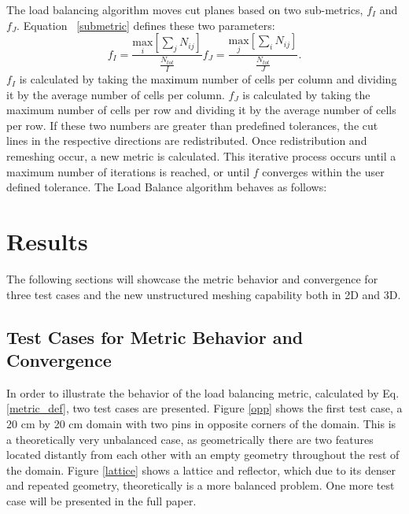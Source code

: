 \documentclass{anstrans}
\begin{document}
The load balancing algorithm moves cut planes based on two sub-metrics, $f_I$ and $f_J$. Equation ~\eqref{submetric} defines these two parameters:
\begin{subequations}
\label{submetric}
\begin{equation}
f_I = \frac{ \underset{i}{\text{max}}[\sum_{j} N_{ij}] } {\frac{N_{tot}}{I}} 
\end{equation}
\begin{equation}
f_J = \frac{\underset{j}{\text{max}}[\sum_{i} N_{ij}] } {\frac{N_{tot}}{J}}.
\end{equation}
\end{subequations}
%
$f_I$ is calculated by taking the maximum number of cells per column and dividing it by the average number of cells per column. $f_J$ is calculated by taking the maximum number of cells per row and dividing it by the average number of cells per row. If these two numbers are greater than predefined tolerances, the cut lines in the respective directions are redistributed. Once redistribution and remeshing occur, a new metric is calculated. This iterative process occurs until a maximum number of iterations is reached, or until $f$ converges within the user defined tolerance. The Load Balance algorithm behaves as follows:



\section{Results}
\label{ch:results}

The following sections will showcase the metric behavior and convergence for three test cases and the new unstructured meshing capability both in 2D and 3D.

\subsection{Test Cases for Metric Behavior and Convergence}
\label{sec:convergence}
In order to illustrate the behavior of the load balancing metric, calculated by Eq.\ref{metric_def}, two test cases are presented. Figure \ref{opp} shows the first test case, a 20 cm by 20 cm domain with two pins in opposite corners of the domain. This is a theoretically very unbalanced case, as geometrically there are two features located distantly from each other with an empty geometry throughout the rest of the domain. Figure \ref{lattice} shows a lattice and reflector, which due to its denser and repeated geometry, theoretically is a more balanced problem. One more test case will be presented in the full paper.
\end{document}
